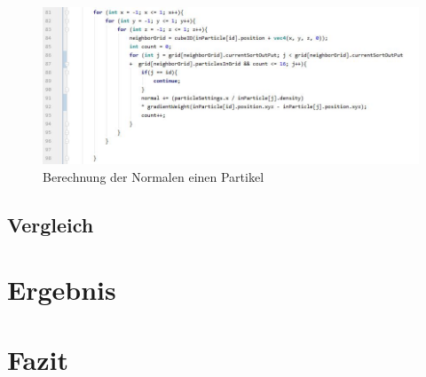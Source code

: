 \documentclass[intern,palatino]{cgBA}
\begin{document}
\begin{figure}[H]
	\centering
	\includegraphics[width=1.3\columnwidth]{Bilder/normal.jpg}
	\caption{Berechnung der Normalen einen Partikel}
	\label{img:normal}
\end{figure}


\subsection{Vergleich}\label{vergleich}




\section{Ergebnis}\label{ergebnis}


\section{Fazit}\label{fazit}



\newpage
\listoffigures
\newpage

\end{document}
